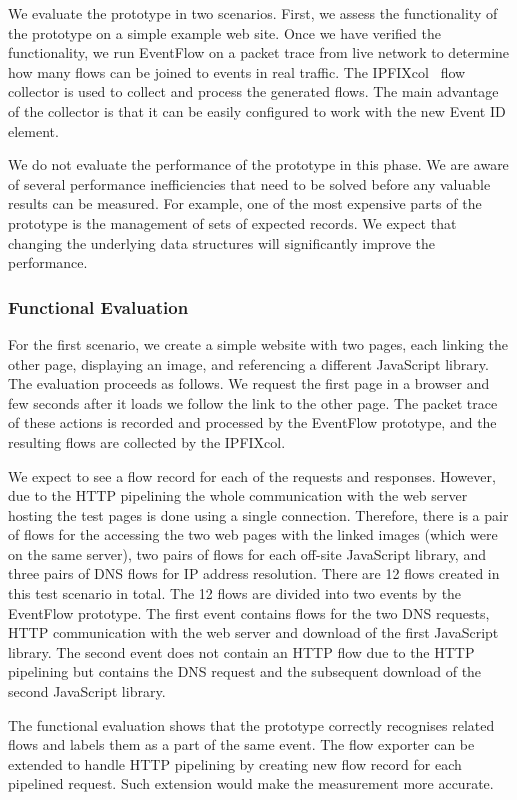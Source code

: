 We evaluate the prototype in two scenarios. First, we assess the functionality of the prototype on a simple example web site. Once we have verified the functionality, we run EventFlow on a packet trace from live network to determine how many flows can be joined to events in real traffic. The IPFIXcol~\cite{Velan-2012-Flow} flow collector is used to collect and process the generated flows. The main advantage of the collector is that it can be easily configured to work with the new Event ID element.

We do not evaluate the performance of the prototype in this phase. We are aware of several performance inefficiencies that need to be solved before any valuable results can be measured. For example, one of the most expensive parts of the prototype is the management of sets of expected records. We expect that changing the underlying data structures will significantly improve the performance.

\subsubsection{Functional Evaluation}
For the first scenario, we create a simple website with two pages, each linking the other page, displaying an image, and referencing a different JavaScript library. The evaluation proceeds as follows. We request the first page in a browser and few seconds after it loads we follow the link to the other page. The packet trace of these actions is recorded and processed by the EventFlow prototype, and the resulting flows are collected by the IPFIXcol.

We expect to see a flow record for each of the requests and responses. However, due to the HTTP pipelining the whole communication with the web server hosting the test pages is done using a single connection. Therefore, there is a pair of flows for the accessing the two web pages with the linked images (which were on the same server), two pairs of flows for each off-site JavaScript library, and three pairs of DNS flows for IP address resolution. There are 12 flows created in this test scenario in total. The 12 flows are divided into two events by the EventFlow prototype. The first event contains flows for the two DNS requests, HTTP communication with the web server and download of the first JavaScript library. The second event does not contain an HTTP flow due to the HTTP pipelining but contains the DNS request and the subsequent download of the second JavaScript library.

The functional evaluation shows that the prototype correctly recognises related flows and labels them as a part of the same event. The flow exporter can be extended to handle HTTP pipelining by creating new flow record for each pipelined request. Such extension would make the measurement more accurate.

